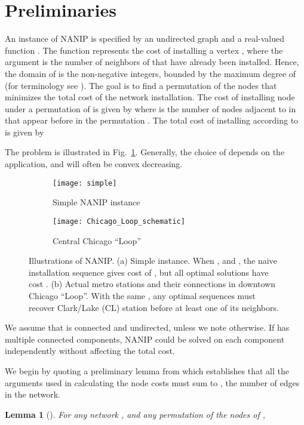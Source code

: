 \documentclass[english]{llncs}
\newtheorem{lem}[thm]{Lemma}
\begin{document}
\section{Preliminaries}
An instance of NANIP is specified by an undirected graph  and a
real-valued function . The function 
represents the cost of installing a vertex , where the argument is the
number of neighbors of  that have already been installed. Hence, the domain
of  is the non-negative integers, bounded by the maximum degree of  (for
terminology see \cite{West01}).  The goal is to find a permutation of the nodes
that minimizes the total cost of the network installation. The cost of
installing node  under a permutation  of  is given by
 where  is the number of nodes
adjacent to  in  that appear before  in the permutation .
The total cost of installing  according to  is given by


The problem is illustrated in Fig.~\ref{fig:illustration}.  Generally, the
choice of  depends on the application, and  will often be convex
decreasing. 

\begin{figure}[th]
\begin{subfigure}[b]{0.4\textwidth}
\centering
\texttt{[image: simple]}
\caption{Simple NANIP instance}
\end{subfigure}\begin{subfigure}[b]{0.6\textwidth}
\centering
\texttt{[image: Chicago\_Loop\_schematic]} 
\caption{Central Chicago ``Loop''}
\end{subfigure}
\caption{Illustrations of NANIP.
(a) Simple instance.  
When ,  and , the naive installation sequence 
gives cost of , but all optimal solutions have cost .\label{fig:illustration}
(b) Actual metro stations and their connections in downtown Chicago ``Loop''.  
With the same , any optimal sequences must recover Clark/Lake (CL) station before at least one of its neighbors.}
\end{figure}

We assume that  is connected and undirected, unless we note otherwise. If
 has multiple connected components, NANIP could be solved on each component
independently without affecting the total cost.

We begin by quoting a preliminary lemma from \cite{Gutfraind14} which
establishes that all the arguments used in calculating the node costs must sum
to , the number of edges in the network.

\begin{lem}[\cite{Gutfraind14}]
\label{lem:edge-decomp}
For any network , and any permutation  of the nodes of , 

\end{lem}
\end{document}
